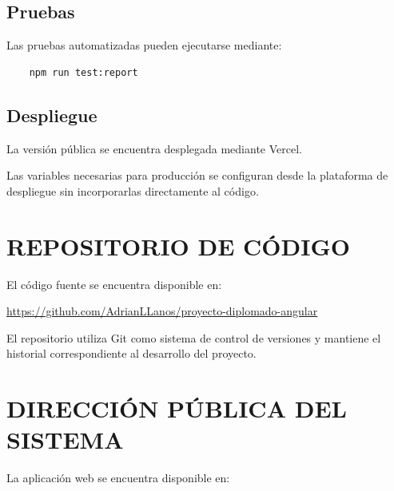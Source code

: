 \section*{Pruebas}

Las pruebas automatizadas pueden ejecutarse mediante:

\begin{verbatim}
	npm run test:report
\end{verbatim}

\section*{Despliegue}

La versión pública se encuentra desplegada mediante Vercel.

Las variables necesarias para producción se configuran desde la plataforma
de despliegue sin incorporarlas directamente al código.




\chapter{REPOSITORIO DE CÓDIGO}

El código fuente se encuentra disponible en:

\begin{center}
	
	\url{
		https://github.com/AdrianLLanos/proyecto-diplomado-angular
	}
	
\end{center}

El repositorio utiliza Git como sistema de control de versiones y mantiene
el historial correspondiente al desarrollo del proyecto.




\chapter{DIRECCIÓN PÚBLICA DEL SISTEMA}

La aplicación web se encuentra disponible en:

